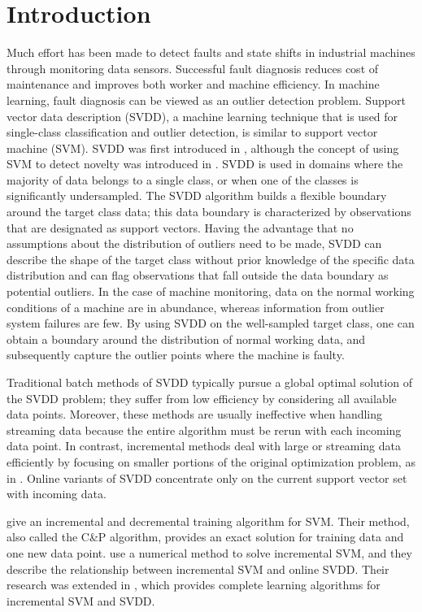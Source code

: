 \documentclass{article}
\numberwithin{equation}{section}
\begin{document}
\section{Introduction}
Much effort has been made to detect faults and state shifts in industrial machines through monitoring data sensors. Successful fault diagnosis reduces cost of maintenance and improves both worker and machine efficiency. In machine learning, fault diagnosis can be viewed as an outlier detection problem. Support vector data description (SVDD), a machine learning technique that is used for single-class classification and outlier detection, is similar to support vector machine (SVM). SVDD was first introduced in \citet{tax2004support}, although the concept of using SVM to detect novelty was introduced in \citet{scholkopf2000support}. SVDD is used in domains where the majority of data belongs to a single class, or when one of the classes is significantly undersampled. The SVDD algorithm builds a flexible boundary around the target class data; this data boundary is characterized by observations that are designated as support vectors. Having the advantage that no assumptions about the distribution of outliers need to be made, SVDD can describe the shape of the target class without prior knowledge of the specific data distribution and can flag observations that fall outside the data boundary as potential outliers. In the case of machine monitoring, data on the normal working conditions of a machine are in abundance, whereas information from outlier system failures are few. By using SVDD on the well-sampled target class, one can obtain a boundary around the distribution of normal working data, and subsequently capture the outlier points where the machine is faulty.  

Traditional batch methods of SVDD typically pursue a global optimal solution of the SVDD problem; they suffer from low efficiency by considering all available data points. Moreover, these methods are usually ineffective when handling streaming data because the entire algorithm must be rerun with each incoming data point. In contrast, incremental methods deal with large or streaming data efficiently by focusing on smaller portions of the original optimization problem, as in \citet{syed1999incremental}. Online variants of SVDD concentrate only on the current support vector set with incoming data.

\citet{cauwenberghs2001incremental} give an incremental and decremental training algorithm for SVM. Their method, also called the C\&P algorithm, provides an exact solution for training data and one new data point. \citet{tax2003online} use a numerical method to solve incremental SVM, and they describe the relationship between incremental SVM and online SVDD. Their research was extended in \citet{laskov2006incremental}, which provides complete learning algorithms for incremental SVM and SVDD.
\end{document}
